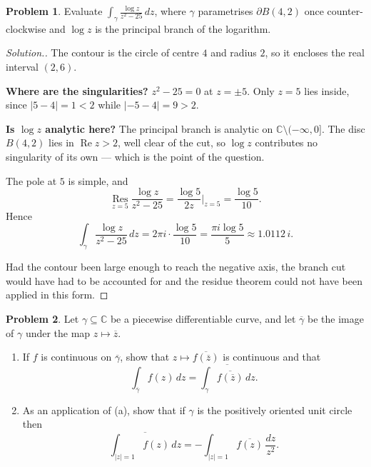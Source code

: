 \documentclass[11pt,a4paper]{article}
\theoremstyle{definition}
\newtheorem{problemx}{Problem}[section]
\newenvironment{problem}{\begin{problemx}}{\end{problemx}}
\newenvironment{solution}
  {\renewcommand{\qedsymbol}{}\begin{proof}[\textit{Solution}.]}
  {\end{proof}}
\begin{document}
\begin{problem}
Evaluate $\displaystyle\int_{\gamma}\frac{\log z}{z^{2} - 25}\,dz$, where
$\gamma$ parametrises $\partial B(4,2)$ once counter-clockwise and $\log z$ is
the principal branch of the logarithm.
\end{problem}

\begin{solution}
The contour is the circle of centre $4$ and radius $2$, so it encloses the real
interval $(2,6)$.

\textbf{Where are the singularities?} $z^{2} - 25 = 0$ at $z = \pm 5$. Only
$z = 5$ lies inside, since $\left|5 - 4\right| = 1 < 2$ while
$\left|-5-4\right| = 9 > 2$.

\textbf{Is $\log z$ analytic here?} The principal branch is analytic on
$\mathbb{C}\setminus(-\infty,0]$. The disc $B(4,2)$ lies in
$\operatorname{Re}z > 2$, well clear of the cut, so $\log z$ contributes no
singularity of its own --- which is the point of the question.

The pole at $5$ is simple, and
$$\operatorname*{Res}_{z=5}\frac{\log z}{z^{2}-25}
= \frac{\log 5}{2z}\bigg|_{z=5} = \frac{\log 5}{10}.$$
Hence
$$\int_{\gamma}\frac{\log z}{z^{2}-25}\,dz
= 2\pi i\cdot\frac{\log 5}{10}
= \boxed{\frac{\pi i \log 5}{5} \approx 1.0112\,i .}$$

Had the contour been large enough to reach the negative axis, the branch cut would
have had to be accounted for and the residue theorem could not have been applied
in this form.
\end{solution}


\begin{problem}
Let $\gamma \subseteq \mathbb{C}$ be a piecewise differentiable curve, and let
$\overline{\gamma}$ be the image of $\gamma$ under the map
$z \mapsto \overline{z}$.
\begin{enumerate}
\item[(a).] If $f$ is continuous on $\overline{\gamma}$, show that
$z \mapsto \overline{f(\overline{z})}$ is continuous and that
$$\int_{\overline{\gamma}} f(z)\,dz
= \overline{\int_{\gamma}\overline{f(\overline{z})}\,dz} .$$
\item[(b).] As an application of (a), show that if $\gamma$ is the positively
oriented unit circle then
$$\overline{\int_{\left|z\right| = 1} f(z)\,dz}
= -\int_{\left|z\right| = 1}\overline{f(z)}\,\frac{dz}{z^{2}} .$$
\end{enumerate}
\end{problem}
\end{document}
